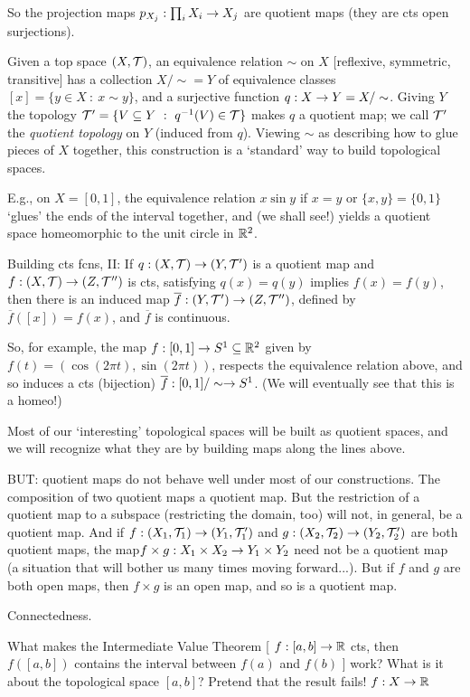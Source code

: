 \documentclass[12pt]{article}
\begin{document}
So the projection maps $p_{X_j}:\prod_i X_i\rightarrow X_j$ are quotient maps (they are cts open surjections).

Given a top space $(X,{\mathcal T})$, an equivalence relation $\sim$ on $X$ [reflexive, symmetric, transitive]
has a collection $X/\sim = Y$ of equivalence classes $[x] = \{y\in X\ :\ x\sim y\}$, and a surjective
function $q:X\rightarrow Y = X/\sim$. Giving $Y$ the topology
$\mtp = \{V\sset Y\ :\ q^{-1}(V)\in\mt\}$ makes $q$ a quotient map; we call 
${\mathcal T}^\prime$ the {\it quotient topology} on $Y$ (induced from $q$). Viewing $\sim$ as describing how to 
glue pieces of $X$ together, this construction is a `standard' way to build topological spaces.

E.g., on $X=[0,1]$, the equivalence relation $x\sin y$ if $x=y$ or $\{x,y\}=\{0,1\}$
`glues' the ends of the interval together, and (we shall see!) yields a quotient space
homeomorphic to the unit circle in ${\mathbb R}^2$.

Building cts fcns, II: If $q:(X,{\mathcal T})\rightarrow (Y,{\mathcal T}^\prime)$ is a quotient map and 
$f:(X,{\mathcal T})\rightarrow (Z,{\mathcal T}^{\prime\prime})$ is cts, satisfying $q(x)=q(y)$ implies $f(x)=f(y)$, then there is 
an induced map $\overline{f}:(Y,{\mathcal T}^\prime)\rightarrow (Z,{\mathcal T}^{\prime\prime})$, defined by $\overline{f}([x])=f(x)$,
and $\overline{f}$ is continuous. 

So, for example, the map $f:[0,1]\rightarrow S^1\subseteq{\mathbb R}^2$ given by 
$f(t)=(\cos(2\pi t),\sin(2\pi t))$, respects the equivalence relation above,
and so induces a cts (bijection) $\overline{f}:[0,1]/\sim\rightarrow S^1$. (We will eventually
see that this is a homeo!)

Most of our `interesting' topological spaces will be built as quotient spaces, and we
will recognize what they are by building maps along the lines above.

BUT: quotient maps do not behave well under most of our constructions.
The composition of two quotient maps  a quotient map. But the restriction
of a quotient map to a subspace (restricting the domain, too) will not, in general,
be a quotient map. And if $f:(X_1,{\mathcal T}_1)\rightarrow (Y_1,{\mathcal T}^\prime_1)$ and $g:(X_2,{\mathcal T}_2)\rightarrow (Y_2,{\mathcal T}^\prime_2)$
are both quotient maps, the map$f\times g:X_1\times X_2\rightarrow Y_1\times Y_2$
need not be a quotient map (a situation that will bother us many times moving forward...).
But if $f$ and $g$ are both open maps, then $f\times g$ is an open map, and so is a quotient 
map.

\msk

Connectedness.

What makes the Intermediate Value Theorem [ $f:[a,b]\rightarrow{\mathbb R}$ cts, then $f([a,b])$ contains
the interval between $f(a)$ and $f(b)$ ] work? What is it about the topological space $[a,b]$?
Pretend that the result fails! $f:X\rightarrow{\mathbb R}$
\end{document}
